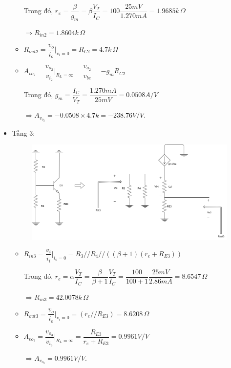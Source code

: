 \begin{itemize}[label=-]
\begin{itemize}[label = +]
		Trong đó, $r_{\pi} = \dfrac{\beta}{g_{m}} = \beta \dfrac{V_{T}}{I_{C}} = 100 \dfrac{25mV}{1.270mA} = 1.9685k\,\Omega$
		
		$\Rightarrow R_{in2} = 1.8604k\,\Omega$
		\item $R_{out2} = \dfrac{v_{o}}{i_{o}}\bigg|_{v_{i} = 0} = R_{C2} = 4.7k \,\Omega$
		\item $A_{vo_{2}} = \dfrac{v_{o_{2}}}{v_{i_{2}}}\bigg|_{R_{L} = \infty} = \dfrac{v_{o_{2}}}{v_{be}} = -g_{m}R_{C2}$
		
		Trong đó, $g_{m} = \dfrac{I_{C}}{V_{T}} = \dfrac{1.270mA}{25mV} = 0.0508 A/V$
		
		$\Rightarrow A_{v_{o_{2}}} = -0.0508\times 4.7k = -238.76 V/V$.
	\end{itemize}
	
	\item Tầng 3:
	
	\begin{figure}[H]
		\centering
		\includegraphics[width=.7\linewidth]{./my-chapters/my-diagrams/Question6/caub_stage3.png}
	\end{figure}
	
	\begin{itemize}[label = +]
		\item $R_{in3} = \dfrac{v_{i}}{i_{i}}\bigg|_{i_{o}=0} = R_{3} // R_{4} // ((\beta + 1)(r_{e} + R_{E3}))$
		
		Trong đó, $r_{e} = \alpha\dfrac{V_{T}}{I_{C}} = \dfrac{\beta}{\beta + 1}\dfrac{V_{T}}{I_{C}} = \dfrac{100}{100+1} \dfrac{25mV}{2.86mA} = 8.6547\,\Omega$
		
		$\Rightarrow R_{in3} = 42.0078k\,\Omega$
		\item $R_{out3} = \dfrac{v_{o}}{i_{o}}\bigg|_{v_{i} = 0} = (r_{e} // R_{E3}) = 8.6208\,\Omega$
		\item $A_{vo_{3}} = \dfrac{v_{o_{3}}}{v_{i_{3}}}\bigg|_{R_{L} = \infty} = \dfrac{R_{E3}}{r_{e} + R_{E3}} = 0.9961 V/V$
		
		$\Rightarrow A_{v_{o_{3}}} = 0.9961 V/V$.
	\end{itemize}
\end{itemize}

